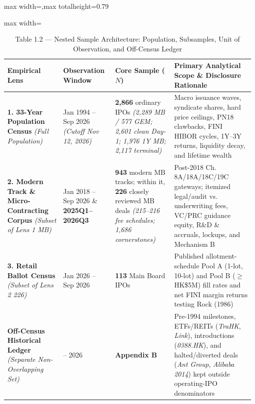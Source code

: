 \documentclass[11pt,letterpaper]{article}
\begin{document}
\begin{table}[!htbp]
\centering
\caption*{Table 1.2 — Nested Sample Architecture: Population, Subsamples, Unit of Observation, and Off-Census Ledger}
\begin{adjustbox}{max width=\textwidth,max totalheight=0.79\textheight}
\begin{minipage}{\textwidth}\centering
\footnotesize
\setlength{\tabcolsep}{3.5pt}
\renewcommand{\arraystretch}{1.18}
\begin{adjustbox}{max width=\textwidth}
\begin{tabular}{>{\raggedright\arraybackslash}p{4.39cm}>{\centering\arraybackslash}p{3.19cm}>{\centering\arraybackslash}p{4.11cm}>{\raggedright\arraybackslash}p{4.11cm}}
\toprule
Empirical Lens & Observation Window & Core Sample ($N$) & Primary Analytical Scope \& Disclosure Rationale \\
\midrule
\textbf{1. 33-Year Population Census} \textit{(Full Population)} & Jan 1994 – Sep 2026 \textit{(Cutoff Nov 12, 2026)} & \textbf{2,866} ordinary IPOs \textit{(2,289 MB / 577 GEM; 2,601 clean Day-1; 1,976 1Y MB; 2,117 terminal)} & Macro issuance waves, syndicate shares, hard price ceilings, PN18 clawbacks, FINI HIBOR cycles, 1Y–3Y returns, liquidity decay, and lifetime wealth \\
\textbf{2. Modern Track \& Micro-Contracting Corpus} \textit{(Subset of Lens 1 MB)} & Jan 2018 – Sep 2026 \& \textbf{2025Q1–2026Q3} & \textbf{943} modern MB tracks; within it, \textbf{226} closely reviewed MB deals \textit{(215–216 fee schedules; 1,686 cornerstones)} & Post-2018 Ch. 8A/18A/18C/19C gateways; itemized legal/audit vs. underwriting fees, VC/PRC guidance equity, R\&D \& accruals, lockups, and Mechanism B \\
\textbf{3. Retail Ballot Census} \textit{(Subset of Lens 2 226)} & Jan 2026 – Sep 2026 & \textbf{113} Main Board IPOs & Published allotment-schedule Pool A (1-lot, 10-lot) and Pool B ($\ge$ HK\$5M) fill rates and net FINI margin returns testing Rock (1986) \\
\textbf{Off-Census Historical Ledger} \textit{(Separate Non-Overlapping Set)} & 1891 – 2026 & \textbf{Appendix B} & Pre-1994 milestones, ETFs/REITs (\textit{TraHK}, \textit{Link}), introductions (\textit{0388.HK}), and halted/diverted deals (\textit{Ant Group}, \textit{Alibaba 2014}) kept outside operating-IPO denominators \\
\bottomrule
\end{tabular}
\end{adjustbox}
\end{minipage}

\end{adjustbox}
\end{table}
\end{document}
